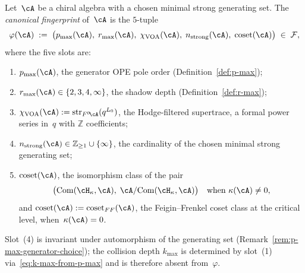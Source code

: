 \begin{definition}
\label{def:canonical-fingerprint}
\ClaimStatusDefinitional
{}
Let~$\cA$ be a chiral algebra with a chosen minimal strong generating
set. The \emph{canonical fingerprint} of~$\cA$ is the $5$-tuple
\begin{equation}\label{eq:fingerprint-def}
\varphi(\cA) \;:=\; \bigl(p_{\max}(\cA),\; r_{\max}(\cA),\; \chi_{\mathrm{VOA}}(\cA),\; n_{\mathrm{strong}}(\cA),\; \mathrm{coset}(\cA)\bigr) \;\in\; \mathcal{F},
\end{equation}
where the five slots are:
\begin{enumerate}[label=\textup{(\arabic*)},leftmargin=*]
\item $p_{\max}(\cA)$, the generator OPE pole order
\textup{(}Definition~\textup{\ref{def:p-max}}\textup{)};
\item $r_{\max}(\cA) \in \{2, 3, 4, \infty\}$, the shadow depth
\textup{(}Definition~\textup{\ref{def:r-max}}\textup{)};
\item $\chi_{\mathrm{VOA}}(\cA) := \operatorname{str}_{F^0\!\cA}(q^{L_0})$,
the Hodge-filtered supertrace, a formal power series in~$q$ with
$\mathbb{Z}$ coefficients;
\item $n_{\mathrm{strong}}(\cA) \in \mathbb{Z}_{\geq 1} \cup \{\infty\}$,
the cardinality of the chosen minimal strong generating set;
\item $\mathrm{coset}(\cA)$, the isomorphism class of the pair
\[
\bigl(\mathrm{Com}(\cH_\kappa, \cA),\;\cA / \mathrm{Com}(\cH_\kappa, \cA)\bigr) \quad\text{when } \kappa(\cA) \neq 0,
\]
and $\mathrm{coset}(\cA) := \mathrm{coset}_{FF}(\cA)$, the
Feigin--Frenkel coset class at the critical level, when~$\kappa(\cA) = 0$.
\end{enumerate}
Slot~(4) is invariant under automorphism of the generating set
\textup{(}Remark~\textup{\ref{rem:p-max-generator-choice}}\textup{)};
the collision depth $k_{\max}$ is determined by slot~(1)
via~\eqref{eq:k-max-from-p-max} and is therefore absent from~$\varphi$.
\end{definition}

